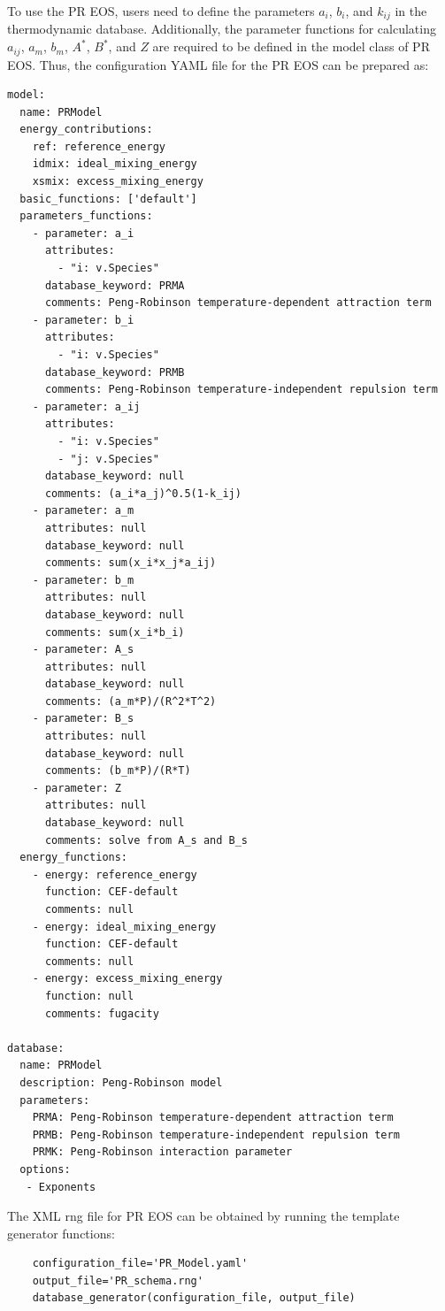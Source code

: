 To use the PR EOS, users need to define the parameters $a_i$, $b_i$, and $k_{ij}$ in the thermodynamic database. Additionally, the parameter functions for calculating $a_{ij}$, $a_m$, $b_m$, $A^*$, $B^*$, and $Z$ are required to be defined in the model class of PR EOS. Thus, the configuration YAML file for the PR EOS can be prepared as:
\begin{verbatim}
model:
  name: PRModel
  energy_contributions:
    ref: reference_energy
    idmix: ideal_mixing_energy
    xsmix: excess_mixing_energy
  basic_functions: ['default']
  parameters_functions:
    - parameter: a_i
      attributes: 
        - "i: v.Species"
      database_keyword: PRMA
      comments: Peng-Robinson temperature-dependent attraction term
    - parameter: b_i
      attributes: 
        - "i: v.Species"
      database_keyword: PRMB
      comments: Peng-Robinson temperature-independent repulsion term
    - parameter: a_ij
      attributes:
        - "i: v.Species"
        - "j: v.Species"
      database_keyword: null
      comments: (a_i*a_j)^0.5(1-k_ij)
    - parameter: a_m
      attributes: null
      database_keyword: null
      comments: sum(x_i*x_j*a_ij)
    - parameter: b_m
      attributes: null
      database_keyword: null
      comments: sum(x_i*b_i)
    - parameter: A_s
      attributes: null
      database_keyword: null
      comments: (a_m*P)/(R^2*T^2)
    - parameter: B_s
      attributes: null
      database_keyword: null
      comments: (b_m*P)/(R*T)
    - parameter: Z
      attributes: null
      database_keyword: null
      comments: solve from A_s and B_s
  energy_functions:
    - energy: reference_energy
      function: CEF-default
      comments: null
    - energy: ideal_mixing_energy
      function: CEF-default
      comments: null
    - energy: excess_mixing_energy
      function: null
      comments: fugacity

database:
  name: PRModel
  description: Peng-Robinson model
  parameters:
    PRMA: Peng-Robinson temperature-dependent attraction term
    PRMB: Peng-Robinson temperature-independent repulsion term
    PRMK: Peng-Robinson interaction parameter
  options:
   - Exponents
\end{verbatim}
The XML rng file for PR EOS can be obtained by running the template generator functions:
\begin{verbatim}
    configuration_file='PR_Model.yaml'
    output_file='PR_schema.rng'
    database_generator(configuration_file, output_file)
\end{verbatim}

